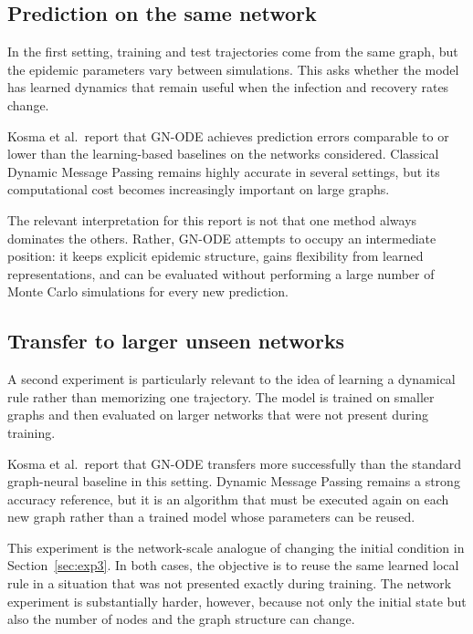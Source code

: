 \documentclass[11pt,a4paper]{article}
\begin{document}
\subsection{Prediction on the same network}

In the first setting, training and test trajectories come from the same graph,
but the epidemic parameters vary between simulations. This asks whether the
model has learned dynamics that remain useful when the infection and recovery
rates change.

Kosma et al.\ report that GN-ODE achieves prediction errors comparable to or
lower than the learning-based baselines on the networks considered. Classical
Dynamic Message Passing remains highly accurate in several settings, but its
computational cost becomes increasingly important on large graphs.

The relevant interpretation for this report is not that one method always
dominates the others. Rather, GN-ODE attempts to occupy an intermediate
position: it keeps explicit epidemic structure, gains flexibility from learned
representations, and can be evaluated without performing a large number of
Monte Carlo simulations for every new prediction.


\subsection{Transfer to larger unseen networks}

A second experiment is particularly relevant to the idea of learning a
dynamical rule rather than memorizing one trajectory. The model is trained on
smaller graphs and then evaluated on larger networks that were not present
during training.

Kosma et al.\ report that GN-ODE transfers more successfully than the standard
graph-neural baseline in this setting. Dynamic Message Passing remains a strong
accuracy reference, but it is an algorithm that must be executed again on each
new graph rather than a trained model whose parameters can be reused.

This experiment is the network-scale analogue of changing the initial
condition in Section~\ref{sec:exp3}. In both cases, the objective is to reuse
the same learned local rule in a situation that was not presented exactly
during training. The network experiment is substantially harder, however,
because not only the initial state but also the number of nodes and the graph
structure can change.


\end{document}
